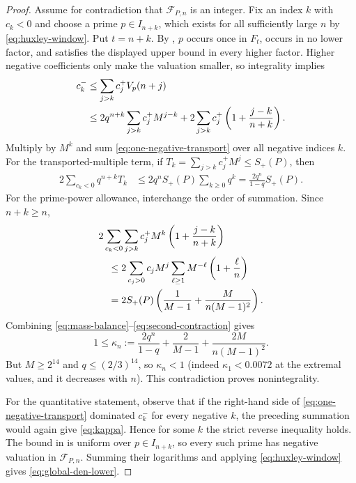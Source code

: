 \documentclass[11pt,oneside]{article}
\theoremstyle{definition}
\theoremstyle{remark}
\newcommand{\FF}{\mathcal F}
\begin{document}
\begin{proof}
Assume for contradiction that $\FF_{P,n}$ is an integer.  Fix an index $k$ with $c_k<0$ and
choose a prime $p\in I_{n+k}$, which exists for all sufficiently large $n$ by
\eqref{eq:huxley-window}.  Put $t=n+k$.  By , $p$ occurs once in
$F_t$, occurs in no lower factor, and satisfies the displayed upper bound in every higher
factor.  Higher negative coefficients only make the valuation smaller, so integrality implies
\begin{align}
 c_k^- &\le
 \sum_{j>k}c_j^+V_p(n+j)                                                   \notag\\
 &\le 2q^{n+k}\sum_{j>k}c_j^+M^{j-k}
 +2\sum_{j>k}c_j^+\left(1+\frac{j-k}{n+k}\right).          \label{eq:one-negative-transport}
\end{align}
Multiply by $M^k$ and sum \eqref{eq:one-negative-transport} over all negative indices $k$.
For the transported-multiple term, if
$T_k=\sum_{j>k}c_j^+M^j\le S_+(P)$, then
\begin{align}
 2\sum_{c_k<0}q^{n+k}T_k
 &\le2q^nS_+(P)\sum_{k\ge0}q^k
 =\frac{2q^n}{1-q}S_+(P).                         \label{eq:first-contraction}
\end{align}
For the prime-power allowance, interchange the order of summation.  Since $n+k\ge n$,
\begin{align}
 &2\sum_{c_k<0}\sum_{j>k}c_j^+M^k
 \left(1+\frac{j-k}{n+k}\right)                                      \notag\\
 &\quad\le2\sum_{c_j>0}c_jM^j
 \sum_{\ell\ge1}M^{-\ell}\left(1+\frac\ell n\right)                  \notag\\
 &\quad=2S_+(P)\left(\frac1{M-1}+\frac{M}{n(M-1)^2}\right).             \label{eq:second-contraction}
\end{align}
Combining \eqref{eq:mass-balance}--\eqref{eq:second-contraction} gives
\begin{equation}
 1\le\kappa_n:=
 \frac{2q^n}{1-q}+\frac{2}{M-1}+\frac{2M}{n(M-1)^2}.                    \label{eq:kappa}
\end{equation}
But $M\ge2^{14}$ and $q\le(2/3)^{14}$, so $\kappa_n<1$ (indeed
$\kappa_1<0.0072$ at the extremal values, and it decreases with $n$).  This contradiction proves nonintegrality.

For the quantitative statement, observe that if the right-hand side of
\eqref{eq:one-negative-transport} dominated $c_k^-$ for every negative $k$, the preceding
summation would again give \eqref{eq:kappa}.  Hence for some $k$ the strict reverse inequality
holds.  The bound in  is uniform over $p\in I_{n+k}$, so every such
prime has negative valuation in $\FF_{P,n}$.  Summing their logarithms and applying
\eqref{eq:huxley-window} gives \eqref{eq:global-den-lower}.
\end{proof}
\end{document}
